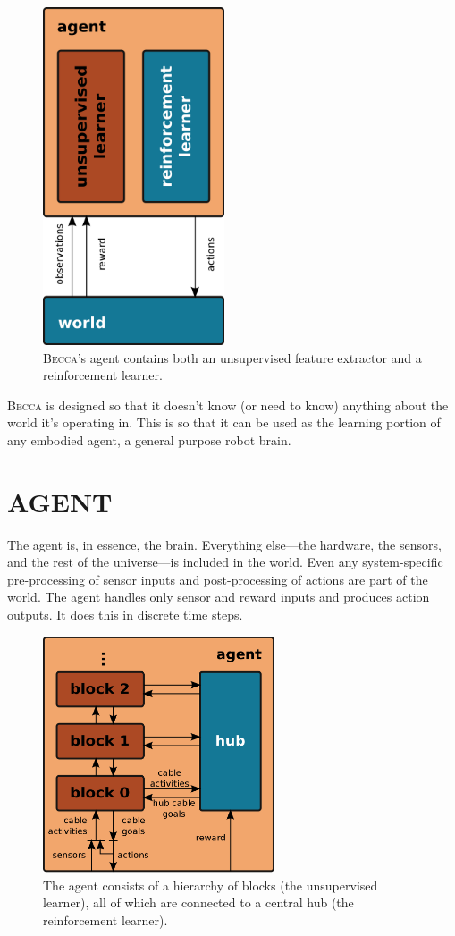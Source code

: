 \documentclass[oneside,twocolumn]{article}
\begin{document}
\begin{figure}[ht]
\centering
\includegraphics[height=10.0cm]{figs/learners.png}
\caption{\textsc{Becca}'s agent contains both an unsupervised feature extractor and a reinforcement learner.}
\label{learners}
\end{figure}

\textsc{Becca} is designed so that it doesn't know (or need to know) anything about the world it's operating in. This is so that it can be used as the learning portion of any embodied agent, a general purpose robot brain.

\section*{\color{copper} AGENT}

The agent is, in essence, the brain. Everything else---the hardware, the sensors, and the rest of the universe---is included in the world. Even any system-specific pre-processing of sensor inputs and post-processing of actions are part of the world. The agent handles only sensor and reward inputs and produces action outputs. It does this in discrete time steps.  

\begin{figure}[ht]
\centering
\includegraphics[height=7.0cm]{figs/agent.png}
\caption{The agent consists of a hierarchy of blocks (the unsupervised learner), all of which are connected to a central hub (the reinforcement learner).}
\label{agent}
\end{figure}
\end{document}
